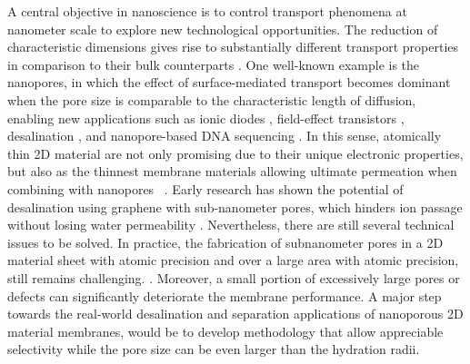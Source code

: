 %
A central objective in nano\-science is to control
transport phenomena at nanometer scale to explore new technological
opportunities.  The reduction of characteristic dimensions gives rise to substantially different transport
properties in comparison to their bulk counterparts
\cite{Schoch_2008_nanofluid}.
%
One well-known example is the nanopores, in which the effect of
surface-mediated transport becomes dominant when the pore size is
comparable to the characteristic length of diffusion, enabling new
applications such as ionic diodes
\cite{Karnik_2007_nanofluidic,Siwy_2002_fabrication_NPore,Vlassiouk_2007_nanofluidic},
field-effect transistors \cite{Nam_2009_IFET_sub10nm}, desalination
\cite{Heiranian_2015_desali}, and nanopore-based DNA sequencing
\cite{Heerema_2016_gr_np_DNA,Garaj_2013_hugging_gr_pore}.
%
In this sense, atomically thin 2D material are not only promising due
to their unique electronic properties, but also as the thinnest
membrane materials allowing ultimate permeation when combining with
nanopores
~\cite{Suk_2010_water_PG,Jiang_2009_PG_gas,Celebi_2014_science,Koenig_2012,Drahushuk_2012_gas_permeation_gr}.
%
Early research has shown the potential of desalination using graphene
with sub-nanometer pores, which hinders ion passage without losing
water permeability
\cite{Cohen_Tanugi_2012,Suk_2014_ion_sub_5nm,Cohen_Tanugi_2014_permeab,Cohen_Tanugi_2015_PG,O_Hern_2014_ion,O_Hern_2015_ion_gr,Surwade_2015_desali_npg,Walker_2017_cation_select_2D,Ghosh_2018_PG_ion}.
Nevertheless, there are still several technical issues to be solved.
In practice, the fabrication of sub\-nanometer pores in
a 2D material sheet with atomic precision and over a large area with
atomic precision, still remains challenging.
\cite{Suk_2014_ion_sub_5nm,Rollings_2016_gating,O_Hern_2012_defect,Wang_2017_mechanism_thin_membrane}.
%
Moreover, a small portion of excessively large pores or defects can
significantly deteriorate the membrane performance.
%
A major step towards the real-world desalination and separation
applications of nanoporous 2D material membranes, would be to develop
methodology that allow appreciable selectivity while the pore size can
be even larger than the hydration radii.


